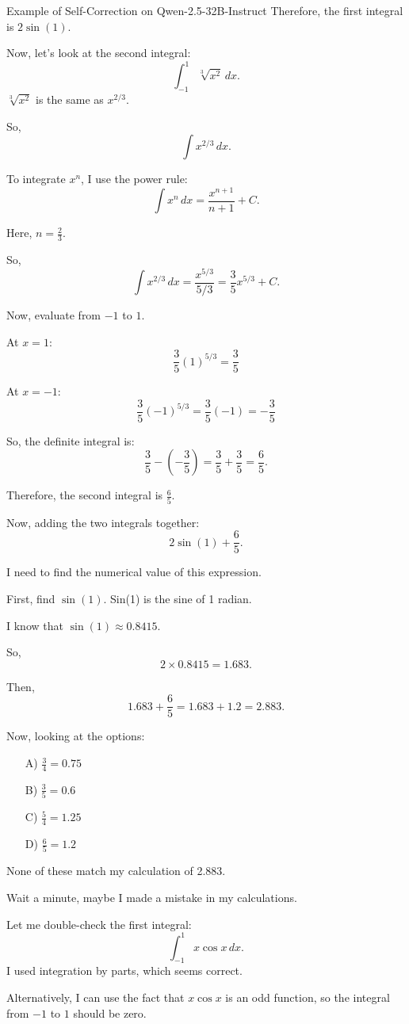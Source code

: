\begin{promptbox}{Example of Self-Correction on Qwen-2.5-32B-Instruct}
Therefore, the first integral is $2 \sin(1)$.

Now, let's look at the second integral:
\[
\int_{-1}^{1} \sqrt[3]{x^2} \,dx.
\]
$\sqrt[3]{x^2}$ is the same as $x^{2/3}$.

So, 
\[
\int x^{2/3} \,dx.
\]

To integrate $x^n$, I use the power rule:
\[
\int x^n \,dx = \frac{x^{n+1}}{n+1} + C.
\]

Here, $n = \frac{2}{3}$.

So,
\[
\int x^{2/3} \,dx = \frac{x^{5/3}}{5/3} = \frac{3}{5} x^{5/3} + C.
\]

Now, evaluate from $-1$ to $1$.

At $x = 1$: 
\[
\frac{3}{5} (1)^{5/3} = \frac{3}{5}
\]

At $x = -1$: 
\[
\frac{3}{5} (-1)^{5/3} = \frac{3}{5}(-1) = -\frac{3}{5}
\]

So, the definite integral is:
\[
\frac{3}{5} - \left(-\frac{3}{5}\right) = \frac{3}{5} + \frac{3}{5} = \frac{6}{5}.
\]

Therefore, the second integral is $\frac{6}{5}$.

Now, adding the two integrals together:
\[
2 \sin(1) + \frac{6}{5}.
\]

I need to find the numerical value of this expression.

First, find $\sin(1)$. Sin(1) is the sine of 1 radian.

I know that $\sin(1) \approx 0.8415$.

So,
\[
2 \times 0.8415 = 1.683.
\]

Then,
\[
1.683 + \frac{6}{5} = 1.683 + 1.2 = 2.883.
\]

Now, looking at the options:
\begin{itemize}
    \item[A)] $\frac{3}{4} = 0.75$
    \item[B)] $\frac{3}{5} = 0.6$
    \item[C)] $\frac{5}{4} = 1.25$
    \item[D)] $\frac{6}{5} = 1.2$
\end{itemize}

{\color{red} None of these match my calculation of 2.883.

Wait a minute, maybe I made a mistake in my calculations.}

Let me double-check the first integral:
\[
\int_{-1}^{1} x \cos x \,dx.
\]
I used integration by parts, which seems correct.

Alternatively, I can use the fact that $x \cos x$ is an odd function, so the integral from $-1$ to $1$ should be zero.


\end{promptbox}
